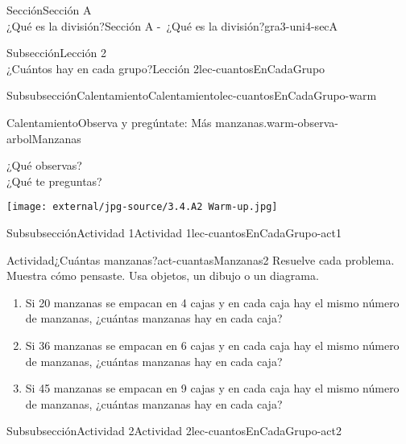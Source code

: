 \begin{sectionptx}{Sección}{{\Large Sección A\\}¿Qué es la división?}{}{Sección A -~¿Qué es la división?}{}{}{gra3-uni4-secA}
\begin{subsectionptx}{Subsección}{{\normalsize Lección 2\\[-0.05cm]}¿Cuántos hay en cada grupo?}{}{Lección 2}{}{}{lec-cuantosEnCadaGrupo}
\begin{subsubsectionptx}{Subsubsección}{Calentamiento}{}{Calentamiento}{}{}{lec-cuantosEnCadaGrupo-warm}
\begin{exploration}{Calentamiento}{Observa y pregúntate: Más manzanas.}{warm-observa-arbolManzanas}%
\begin{sidebyside}{2}{0.0}{0.0}{0.05}%
\begin{sbspanel}{0.4}%
¿Qué observas?\\
 ¿Qué te preguntas?%
\end{sbspanel}%
\begin{sbspanel}{0.55}%
\begin{image}{0.15}{0.7}{0.15}{}%
\texttt{[image: external/jpg-source/3.4.A2 Warm-up.jpg]}
\end{image}%
\end{sbspanel}%
\end{sidebyside}%
\end{exploration}%
%
\end{subsubsectionptx}
%
%
\typeout{************************************************}
\typeout{************************************************}
%
\begin{subsubsectionptx}{Subsubsección}{Actividad 1}{}{Actividad 1}{}{}{lec-cuantosEnCadaGrupo-act1}
\begin{activity}{Actividad}{¿Cuántas manzanas?}{act-cuantasManzanas2}%
Resuelve cada problema. Muestra cómo pensaste. Usa objetos, un dibujo o un diagrama.%
\par
%
\begin{enumerate}
\item{}Si 20 manzanas se empacan en 4 cajas y en cada caja hay el mismo número de manzanas, ¿cuántas manzanas hay en cada caja?%
\item{}Si 36 manzanas se empacan en 6 cajas y en cada caja hay el mismo número de manzanas, ¿cuántas manzanas hay en cada caja?%
\item{}Si 45 manzanas se empacan en 9 cajas y en cada caja hay el mismo número de manzanas, ¿cuántas manzanas hay en cada caja?%
\end{enumerate}
%
\end{activity}%
\end{subsubsectionptx}
%
%
\typeout{************************************************}
\typeout{************************************************}
%
\begin{subsubsectionptx}{Subsubsección}{Actividad 2}{}{Actividad 2}{}{}{lec-cuantosEnCadaGrupo-act2}

\end{subsubsectionptx}
\end{subsectionptx}
\end{sectionptx}
